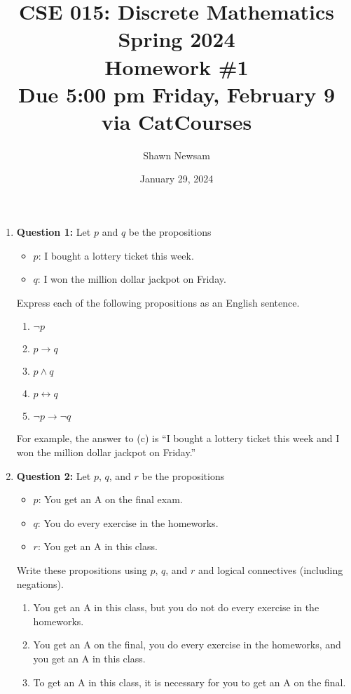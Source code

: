 \documentclass[11pt]{article}
\begin{document}
\author{Shawn Newsam}
\title{CSE 015: Discrete Mathematics\\
Spring 2024\\
Homework \#1\\
Due 5:00 pm Friday, February 9 via CatCourses}
\date{January 29, 2024}
\maketitle
\begin{enumerate}
\item
\textbf{Question 1:}
Let $p$ and $q$ be the propositions
\begin{itemize}
\item[] $p$: I bought a lottery ticket this week.
\item[] $q$: I won the million dollar jackpot on Friday.
\end{itemize}
Express each of the following propositions as an English sentence.
\begin{enumerate}[label=(\alph*)]
\item $\lnot p$
\item $p \rightarrow q$
\item $p \land q$
\item $p \leftrightarrow q$
\item $\lnot p \rightarrow \lnot q$
\end{enumerate}
For example, the answer to (c) is ``I bought a lottery ticket this week and I won
the million dollar jackpot on Friday.''
\item
\textbf{Question 2:}
Let $p$, $q$, and $r$ be the propositions
\begin{itemize}
\item[] $p$: You get an A on the final exam.
\item[] $q$: You do every exercise in the homeworks.
\item[] $r$: You get an A in this class.
\end{itemize}
Write these propositions using $p$, $q$, and $r$ and logical connectives (including
negations).
\begin{enumerate}[label=(\alph*)]
\item You get an A in this class, but you do not do every exercise in the
homeworks.
\item You get an A on the final, you do every exercise in the homeworks, and you
get an A in this class.
\item To get an A in this class, it is necessary for you to get an A on the final.

\end{enumerate}
\end{enumerate}
\end{document}
